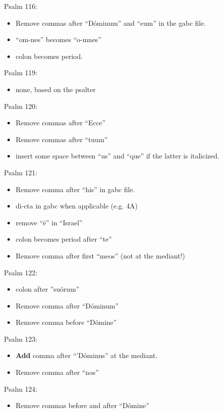 \documentclass[11pt]{article}
\begin{document}
    Psalm 116:
  \begin{itemize}
 \item Remove commas after ``Dóminum'' and ``eum'' in the gabc file.
 \item
 ``om-nes'' becomes  ``o-mnes''
 \item
 colon becomes period.
\end{itemize}

 Psalm 119:
  \begin{itemize}
  \item none, based on the psalter
    \end{itemize}

 Psalm 120:
  \begin{itemize}
  \item Remove commas after ``Ecce''
  \item  Remove commas after ``tuum''
  \item
  insert some space between ``us'' and ``que'' if the latter is italicized.
    \end{itemize}

   Psalm 121:
  \begin{itemize}
    \item Remove comma after ``his'' in gabc file.
        \item di-cta in gabc when applicable (e.g. 4A)
        \item
        remove ``ë'' in ``Israel''
    \item colon becomes period after ``te''
    \item Remove comma after first ``meos'' (not at the mediant!)
      \end{itemize}
      
       Psalm 122:
  \begin{itemize}
  \item colon after ''suórum''
  \item  Remove comma after ``Dóminum''
    \item  Remove comma before ``Dómine''
    \end{itemize}

Psalm 123:
  \begin{itemize}
  \item \textbf{Add} comma after ``'Dóminus'' at the mediant.
  \item  Remove comma after ``nos''
    \end{itemize}

Psalm 124:
  \begin{itemize}
  \item Remove commas before and after ``Dómine''
    \end{itemize}
      
\end{document}
